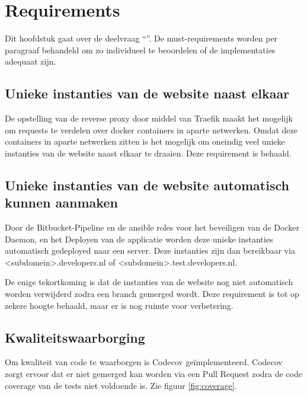 \chapter{Requirements}

\label{Chapter7}

Dit hoofdstuk gaat over de deelvraag \enquote{\deelrequirements}. De must-requirements worden per paragraaf behandeld om zo individueel te beoordelen of de implementaties adequaat zijn.

\section{Unieke instanties van de website naast elkaar}
De opstelling van de reverse proxy door middel van Traefik maakt het mogelijk om requests te verdelen over docker containers in aparte netwerken. Omdat deze containers in aparte netwerken zitten is het mogelijk om oneindig veel unieke instanties van de website naast elkaar te draaien. Deze requirement is behaald.

\section{Unieke instanties van de website automatisch kunnen aanmaken}
Door de Bitbucket-Pipeline en de ansible roles voor het beveiligen van de Docker Daemon, en het Deployen van de applicatie worden deze unieke instanties automatisch gedeployed naar een server. Deze instanties zijn dan bereikbaar via <subdomein>.developers.nl of <subdomein>.test.developers.nl.

De enige tekortkoming is dat de instanties van de website nog niet automatisch worden verwijderd zodra een branch gemerged wordt. Deze requirement is tot op zekere hoogte behaald, maar er is nog ruimte voor verbetering.

\section{Kwaliteitswaarborging}
Om kwaliteit van code te waarborgen is Codecov geïmplementeerd. Codecov zorgt ervoor dat er niet gemerged kan worden via een Pull Request zodra de code coverage van de tests niet voldoende is. Zie figuur \ref{fig:coverage}.

